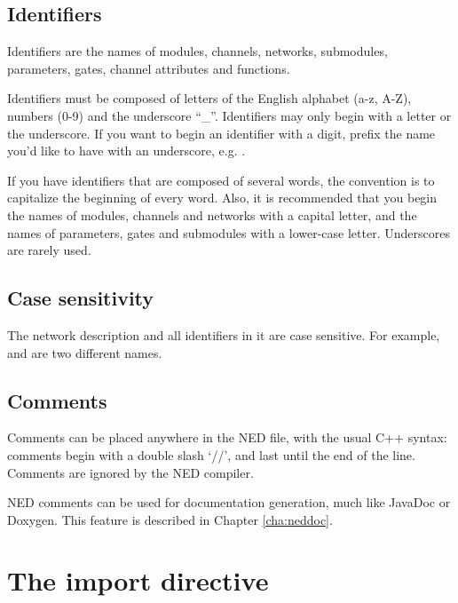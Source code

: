 

\subsection{Identifiers}

Identifiers are the names of modules, channels, networks,
submodules, parameters, gates, channel attributes and functions.

Identifiers must be composed of letters of the English alphabet (a-z, A-Z),
numbers (0-9) and the underscore ``\_''.
Identifiers may only begin with a letter or the underscore.
If you want to begin an identifier with a digit, prefix the name
you'd like to have with an underscore, e.g. .

If you have identifiers that are composed of several words, the convention
is to capitalize the beginning of every word. Also, it is recommended
that you begin the names of modules, channels and networks with
a capital letter, and the names of parameters, gates and submodules
with a lower-case letter. Underscores are rarely used.


\subsection{Case sensitivity}

The network description and all identifiers in it are case sensitive.
For example,  and  are two different names.


\subsection{Comments}

Comments can be placed anywhere in the NED file, with the usual C++
syntax: comments begin with a double slash `//', and last until
the end of the line. Comments are ignored by the NED compiler.

NED comments can be used for documentation generation,
much like JavaDoc or Doxygen. This feature is described in
Chapter \ref{cha:neddoc}.



\section{The import directive}

